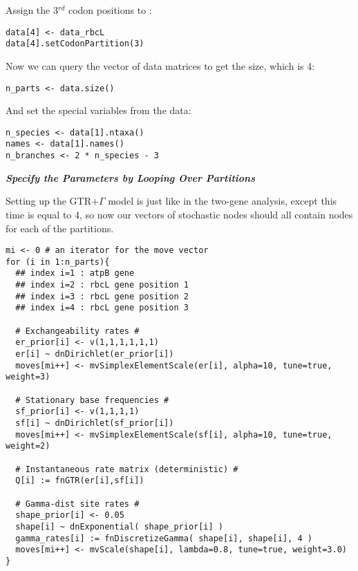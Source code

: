 Assign the 3$^{rd}$ codon positions to :
{\tt \begin{snugshade*}
\begin{lstlisting}
data[4] <- data_rbcL
data[4].setCodonPartition(3)
\end{lstlisting}
\end{snugshade*}}



Now we can query the vector of data matrices to get the size, which is 4:
{\tt \begin{snugshade*}
\begin{lstlisting}
n_parts <- data.size()
\end{lstlisting}
\end{snugshade*}}

And set the special variables from the data:
{\tt \begin{snugshade*}
\begin{lstlisting}
n_species <- data[1].ntaxa()
names <- data[1].names()
n_branches <- 2 * n_species - 3
\end{lstlisting}
\end{snugshade*}}




\textbf{\textit{Specify the Parameters by Looping Over Partitions}}

Setting up the GTR+$\Gamma$ model is just like in the two-gene analysis, except this time  is equal to 4, so now our vectors of stochastic nodes should all contain nodes for each of the partitions.
{\tt \small \begin{snugshade*}
\begin{lstlisting}
mi <- 0 # an iterator for the move vector
for (i in 1:n_parts){
  ## index i=1 : atpB gene
  ## index i=2 : rbcL gene position 1
  ## index i=3 : rbcL gene position 2
  ## index i=4 : rbcL gene position 3

  # Exchangeability rates #
  er_prior[i] <- v(1,1,1,1,1,1)
  er[i] ~ dnDirichlet(er_prior[i])
  moves[mi++] <- mvSimplexElementScale(er[i], alpha=10, tune=true, weight=3) 

  # Stationary base frequencies #
  sf_prior[i] <- v(1,1,1,1)
  sf[i] ~ dnDirichlet(sf_prior[i])
  moves[mi++] <- mvSimplexElementScale(sf[i], alpha=10, tune=true, weight=2) 

  # Instantaneous rate matrix (deterministic) #
  Q[i] := fnGTR(er[i],sf[i]) 

  # Gamma-dist site rates #
  shape_prior[i] <- 0.05 
  shape[i] ~ dnExponential( shape_prior[i] )
  gamma_rates[i] := fnDiscretizeGamma( shape[i], shape[i], 4 )
  moves[mi++] <- mvScale(shape[i], lambda=0.8, tune=true, weight=3.0)
}
\end{lstlisting}
\end{snugshade*}}


